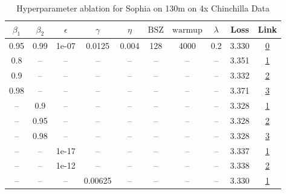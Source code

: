 \begin{table}[H]
\centering
\caption{Hyperparameter ablation for Sophia on 130m on 4x Chinchilla Data}
\label{tab:ablation_sophia_130m_on_4x_chinchilla_data}
\begin{tabular}{cccccccccc}
\toprule
$\beta_1$ & $\beta_2$ & $\epsilon$ & $\gamma$ & $\eta$ & $\mathrm{BSZ}$ & $\mathrm{warmup}$ & $\lambda$ & Loss & Link \\
\midrule
0.95 & 0.99 & 1e-07 & 0.0125 & 0.004 & 128 & 4000 & 0.2 & 3.330 & \href{https://wandb.ai/marin-community/optimizer-scaling/runs/sweep-130m-10B-sophia420680lr0.004-wd0.2-minlr0-warmup4000-b10.9-95e0d1}{0} \\
\midrule
0.8 & -- & -- & -- & -- & -- & -- & -- & 3.351 & \href{https://wandb.ai/marin-community/optimizer-scaling/runs/sweep-130m-10B-sophiam200bcelr0.004-wd0.2-minlr0-warmup4000-b10.-64829e}{1} \\
0.9 & -- & -- & -- & -- & -- & -- & -- & 3.332 & \href{https://wandb.ai/marin-community/optimizer-scaling/runs/sweep-130m-10B-sophiamb9ea0dlr0.004-wd0.2-minlr0-warmup4000-b10.-05ae6d}{2} \\
0.98 & -- & -- & -- & -- & -- & -- & -- & 3.371 & \href{https://wandb.ai/marin-community/optimizer-scaling/runs/sweep-130m-10B-sophiam2761c5lr0.004-wd0.2-minlr0-warmup4000-b10.-5683e6}{3} \\
-- & 0.9 & -- & -- & -- & -- & -- & -- & 3.328 & \href{https://wandb.ai/marin-community/optimizer-scaling/runs/sweep-130m-10B-sophiamc45a60lr0.004-wd0.2-minlr0-warmup4000-b10.-c9c782}{1} \\
-- & 0.95 & -- & -- & -- & -- & -- & -- & 3.328 & \href{https://wandb.ai/marin-community/optimizer-scaling/runs/sweep-130m-10B-sophiamba4c53lr0.004-wd0.2-minlr0-warmup4000-b10.-80e6d8}{2} \\
-- & 0.98 & -- & -- & -- & -- & -- & -- & 3.328 & \href{https://wandb.ai/marin-community/optimizer-scaling/runs/sweep-130m-10B-sophiam0657f9lr0.004-wd0.2-minlr0-warmup4000-b10.-e83579}{3} \\
-- & -- & 1e-17 & -- & -- & -- & -- & -- & 3.337 & \href{https://wandb.ai/marin-community/optimizer-scaling/runs/sweep-130m-10B-sophiam98a019lr0.004-wd0.2-minlr0-warmup4000-b10.-edcb0a}{1} \\
-- & -- & 1e-12 & -- & -- & -- & -- & -- & 3.338 & \href{https://wandb.ai/marin-community/optimizer-scaling/runs/sweep-130m-10B-sophiame63af6lr0.004-wd0.2-minlr0-warmup4000-b10.-d35185}{2} \\
-- & -- & -- & 0.00625 & -- & -- & -- & -- & 3.330 & \href{https://wandb.ai/marin-community/optimizer-scaling/runs/sweep-130m-10B-sophiamb10b9alr0.004-wd0.2-minlr0-warmup4000-b10.-4aa147}{1} \\

\end{tabular}
\end{table}
